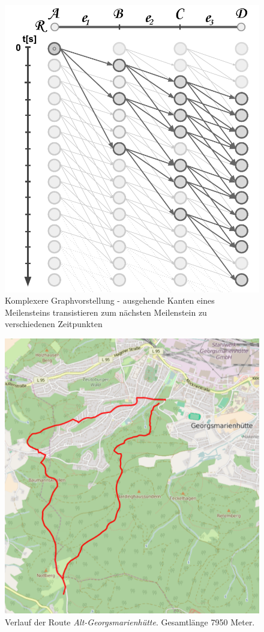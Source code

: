 \documentclass[12pt]{article}
\begin{document}
\begin{figure}[hp]
	\begin{center}
	\includegraphics[width=\textwidth]{pics/pdf/006_Graph_der_Optimierung_Richtig.pdf}
	\caption{Komplexere Graphvorstellung - ausgehende Kanten eines Meilensteins transistieren zum nächsten Meilenstein zu verschiedenen Zeitpunkten }
	\label{pic:graph_right}
	\end{center}
\end{figure}

\begin{figure}[hp]
	\begin{center}
	\includegraphics[width=\textwidth]{pics/png/02_Ergebnis_Big_Huette.png}
	\caption{Verlauf der Route \textit{Alt-Georgsmarienhütte}. Gesamtlänge 7950 Meter.}
	\label{pic:big_tour}
	\end{center}
\end{figure}
\end{document}
